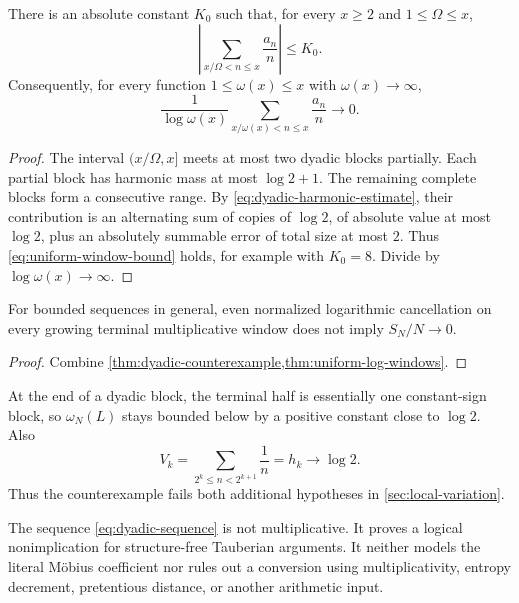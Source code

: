 \begin{theorem}
\label{thm:uniform-log-windows}
There is an absolute constant \(K_0\) such that, for every
\(x\ge2\) and \(1\le\Omega\le x\),
\begin{equation}
 \left|
 \sum_{x/\Omega<n\le x}\frac{a_n}{n}
 \right|\le K_0.
\label{eq:uniform-window-bound}
\end{equation}
Consequently, for every function
\(1\le\omega(x)\le x\) with \(\omega(x)\to\infty\),
\begin{equation}
 \frac1{\log\omega(x)}
 \sum_{x/\omega(x)<n\le x}\frac{a_n}{n}
 \longrightarrow0.
\label{eq:normalized-window-cancellation}
\end{equation}
\end{theorem}

\begin{proof}
The interval \((x/\Omega,x]\) meets at most two dyadic blocks
partially.  Each partial block has harmonic mass at most
\(\log2+1\).  The remaining complete blocks form a consecutive
range.  By \eqref{eq:dyadic-harmonic-estimate}, their contribution
is an alternating sum of copies of \(\log2\), of absolute value at
most \(\log2\), plus an absolutely summable error of total size at
most \(2\).  Thus \eqref{eq:uniform-window-bound} holds, for example
with \(K_0=8\).  Divide by \(\log\omega(x)\to\infty\).
\end{proof}

\begin{corollary}
\label{cor:black-box-failure}
For bounded sequences in general, even normalized logarithmic
cancellation on every growing terminal multiplicative window does
not imply \(S_N/N\to0\).
\end{corollary}

\begin{proof}
Combine \cref{thm:dyadic-counterexample,thm:uniform-log-windows}.
\end{proof}

\begin{remark}
\label{rem:counterexample-local-failure}
At the end of a dyadic block, the terminal half is essentially one
constant-sign block, so \(\omega_N(L)\) stays bounded below by a
positive constant close to \(\log2\).  Also
\[
 V_k=\sum_{2^k\le n<2^{k+1}}\frac1n=h_k\to\log2.
\]
Thus the counterexample fails both additional hypotheses in
\cref{sec:local-variation}.
\end{remark}

\begin{remark}[Scope]
\label{rem:counterexample-scope}
The sequence \eqref{eq:dyadic-sequence} is not multiplicative.  It
proves a logical nonimplication for structure-free Tauberian
arguments.  It neither models the literal M\"obius coefficient nor
rules out a conversion using multiplicativity, entropy decrement,
pretentious distance, or another arithmetic input.
\end{remark}
